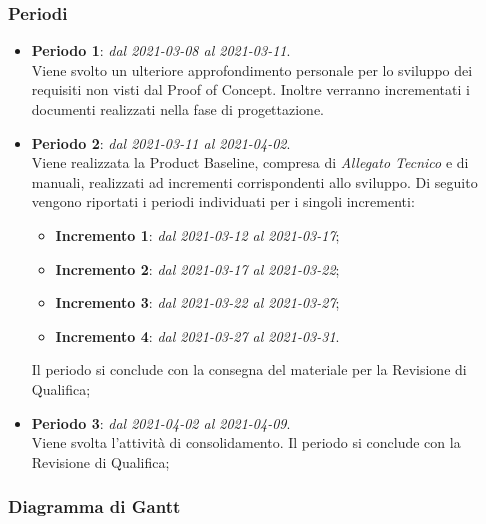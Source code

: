 \subsubsection{Periodi}

\begin{itemize}
\item \textbf{Periodo 1}: \textit{dal 2021-03-08 al 2021-03-11}. \\
Viene svolto un ulteriore approfondimento personale per lo sviluppo dei requisiti non visti dal Proof of Concept. Inoltre verranno incrementati i documenti realizzati nella fase di progettazione.
\item \textbf{Periodo 2}: \textit{dal 2021-03-11 al 2021-04-02}. \\
Viene realizzata la Product Baseline, compresa di \textit{Allegato Tecnico} e di manuali, realizzati ad incrementi corrispondenti allo sviluppo. Di seguito vengono riportati i periodi individuati per i singoli incrementi:
\begin{itemize}
\item \textbf{Incremento 1}: \textit{dal 2021-03-12 al 2021-03-17};
\item \textbf{Incremento 2}: \textit{dal 2021-03-17 al 2021-03-22};
\item \textbf{Incremento 3}: \textit{dal 2021-03-22 al 2021-03-27};
\item \textbf{Incremento 4}: \textit{dal 2021-03-27 al 2021-03-31}.
\end{itemize}
Il periodo si conclude con la consegna del materiale per la Revisione di Qualifica;
\item \textbf{Periodo 3}: \textit{dal 2021-04-02 al 2021-04-09}. \\
Viene svolta l'attività di consolidamento. Il periodo si conclude con la Revisione di Qualifica;
\end{itemize}

\subsubsection{Diagramma di Gantt}

